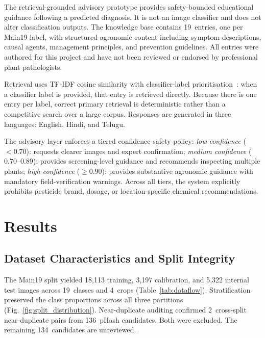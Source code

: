 \documentclass[conference]{IEEEtran}
\begin{document}
The retrieval-grounded advisory prototype provides safety-bounded
educational guidance following a predicted diagnosis. It is not an
image classifier and does not alter classification outputs. The
knowledge base contains 19~entries, one per Main19 label, with
structured agronomic content including symptom descriptions, causal
agents, management principles, and prevention guidelines. All entries
were authored for this project and have not been reviewed or endorsed
by professional plant pathologists.

Retrieval uses TF-IDF cosine similarity with classifier-label
prioritisation~\cite{robertson2009bm25}: when a classifier label is
provided, that entry is retrieved directly. Because there is one entry
per label, correct primary retrieval is deterministic rather than a
competitive search over a large corpus. Responses are generated in
three languages: English, Hindi, and Telugu.

The advisory layer enforces a tiered confidence-safety policy:
\textit{low confidence} ($<0.70$): requests clearer images and expert
confirmation; \textit{medium confidence} ($0.70$--$0.89$): provides
screening-level guidance and recommends inspecting multiple plants;
\textit{high confidence} ($\geq 0.90$): provides substantive
agronomic guidance with mandatory field-verification warnings. Across
all tiers, the system explicitly prohibits pesticide brand, dosage, or
location-specific chemical recommendations.

\section{Results}
\label{sec:results}

\subsection{Dataset Characteristics and Split Integrity}

The Main19 split yielded 18{,}113 training, 3{,}197 calibration, and
5{,}322 internal test images across 19~classes and 4~crops
(Table~\ref{tab:dataflow}). Stratification preserved the class
proportions across all three partitions
(Fig.~\ref{fig:split_distribution}). Near-duplicate auditing
confirmed 2~cross-split near-duplicate pairs from 136~pHash
candidates. Both were excluded. The remaining 134~candidates are
unreviewed.
\end{document}
